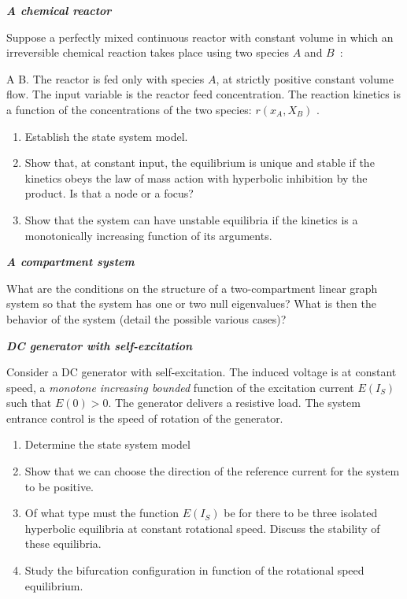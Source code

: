 \begin{exercice}{\bf \em A chemical reactor}

Suppose a perfectly mixed continuous reactor with constant volume 
in which an irreversible chemical reaction takes place 
using two species $A$ and $B$~:

\eqnn
A \longrightarrow B.
\eeqnn
The reactor is fed only with species $A$, at 
strictly positive constant volume flow. The input variable is
the reactor feed concentration. The reaction kinetics
is a function of the concentrations of the two species: $r(x_A,X_B)$ .

\begin{enumerate}
\item Establish the state system model.
\item Show that, at constant input, the equilibrium is unique and
stable if the kinetics obeys the law of mass action with hyperbolic inhibition
by the product. Is that a node or a focus?

\item Show that the system can have unstable equilibria 
if the kinetics is a monotonically increasing function of its
arguments.
\end{enumerate}
\end{exercice}
\vv

\begin{exercice} {\bf \em A compartment system}

What are the conditions on the structure of a two-compartment linear graph system so that the system has
one or two null eigenvalues? What is then the behavior of the
system (detail the possible various cases)?

\end{exercice}
\vv

\begin{exercice}{\bf \em DC generator with self-excitation}

Consider a DC generator with self-excitation. The induced voltage is at constant speed, a {\em monotone increasing bounded} 
function of  the excitation current $E( I_S)$ such that $E(0)>0$. 
The generator delivers a resistive load. The system entrance control is the speed of rotation of the
generator.

\begin{enumerate}
\item Determine the state system model
\item Show that we can choose the direction of the reference current for the system to be positive.
\item Of what type must the function $E(I_S)$ be for there to be three
isolated hyperbolic equilibria at constant rotational speed. Discuss the stability of these equilibria.
\item Study the bifurcation configuration in function of the rotational speed equilibrium.
\end{enumerate}
\end{exercice}
\vv

